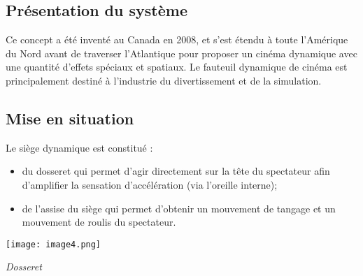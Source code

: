 \ifprof
\else
\begin{multicols}{2}
\fi


\section*{Présentation du système}
\setcounter{exo}{0}
\ifprof
\else
Ce concept a été inventé au Canada en 2008, et s'est étendu à toute l'Amérique du Nord avant de traverser l'Atlantique pour proposer un cinéma dynamique avec une quantité d'effets spéciaux et spatiaux. Le fauteuil dynamique de cinéma est principalement destiné à l'industrie du divertissement et de la simulation.
\fi

\subsection*{Mise en situation}
\ifprof
\else

Le siège dynamique est constitué :
\begin{itemize}
\item du dosseret qui permet d'agir directement sur la tête du spectateur afin d'amplifier la sensation d'accélération (via
l'oreille interne);%
\item de l'assise du siège qui permet d'obtenir un mouvement de tangage et un mouvement de roulis du spectateur.
\end{itemize}

\begin{center}
\texttt{[image: image4.png]}

\textit{Dosseret \label{fig2}}
\end{center}





\end{multicols}
